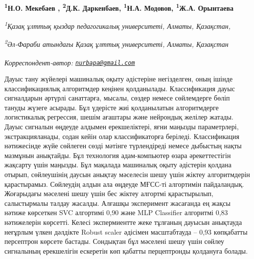 
\begin{articleheader}

{\bfseries
\textsuperscript{1}Н.О. Мекебаев\textsuperscript{\envelope } \authorid,
\textsuperscript{2}Д.К. Даркенбаев\authorid,
\textsuperscript{1}Н.А. Модовов\authorid,
\textsuperscript{1}Ж.А. Орынтаева\authorid}
\end{articleheader}

\begin{affiliation}
{\em \textsuperscript{1}Қазақ ұлттық қыздар педагогикалық университеті, Алматы, Қазақстан,}

{\em \textsuperscript{2}Әл-Фараби атындағы Қазақ ұлттық университеті, Алматы, Қазақстан}

\raggedright \textsuperscript{\envelope }{\em Корреспондент-автор: \href{mailto:nurbapa@gmail.com}{\nolinkurl{nurbapa@gmail.com}}}
\end{affiliation}

Дауыс тану жүйелері машиналық оқыту әдістеріне негізделген, оның ішінде
классификациялық алгоритмдер кеңінен қолданылады. Классификация дауыс
сигналдарын әртүрлі санаттарға, мысалы, сөздер немесе сөйлемдерге бөліп
тануды жүзеге асырады. Бұл үдерісте жиі қолданылатын алгоритмдерге
логистикалық регрессия, шешім ағаштары және нейрондық желілер жатады.
Дауыс сигналын өңдеуде алдымен ерекшеліктері, яғни маңызды параметрлері,
экстракцияланады, содан кейін олар классификаторға беріледі.
Классификация нәтижесінде жүйе сөйлеген сөзді мәтінге түрлендіреді
немесе дыбыстың нақты мазмұнын анықтайды. Бұл технология адам-компьютер
өзара әрекеттестігін жақсарту үшін маңызды. Бұл мақалада машиналық оқыту
әдістерін қолдана отырып, сөйлеушінің даусын анықтау мәселесін шешу үшін
жіктеу алгоритмдерін қарастырамыз. Сөйлеудің алдын ала өңдеуде МҒСС-ті
алгортимін пайдаландық. Жоғарыдағы мәселені шешу үшін бес жіктеу
алгортмі қарастырылып, салыстырмалы талдау жасалды. Алғашқы эксперимент
жасағанда ең жақсы нәтиже көрсеткен SVC алгортимі 0,90 және MLP
Classifier алгоритмі 0,83 нәтижелерін көрсетті. Келесі экспермиентте
жеке тұлғаның дауысын анықтауда неғұрлым үлкен дәлдікте Robust scaler
әдісімен масштабтауда -- 0,93 көпқабатты персептрон көрсете бастады.
Сондықтан бұл мәселені шешу үшін сөйлеу сигналының ерекшелігін ескеретін
көп қабатты перцептронды қолдануға болады.

